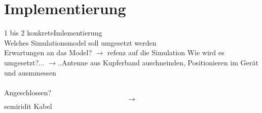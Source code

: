 \newpage 
\thispagestyle{empty}
\chapter{Implementierung}\label{sec:Implementierung}
1 bis 2 konkreteImlementierung\\
Welches Simulationsmodel soll umgesetzt werden\\
Erwartungen an das Model? $\rightarrow$ refenz auf die Simulation
Wie wird es umgesetzt?...  $\rightarrow$..Antenne aus Kupferband auschneinden, Positionieren im Gerät und ausmmessen\\
\\
Angeschlossen?$$\rightarrow$$ semiridit Kabel \\



